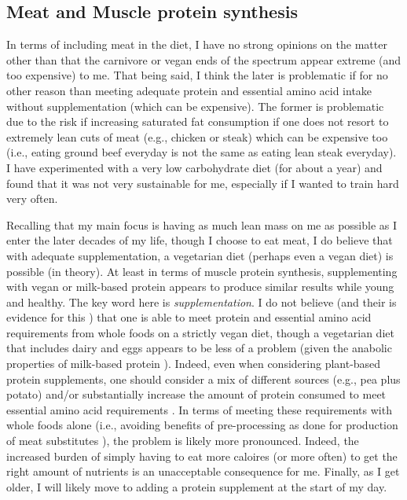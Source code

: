 \documentclass[10pt,twocolumn]{extarticle}
\begin{document}
\subsection{Meat and Muscle protein synthesis}

In terms of including meat in the diet, I have no strong opinions on the matter other than that the carnivore or vegan ends of the spectrum appear extreme (and too expensive) to me. That being said, I think the later is problematic if for no other reason than meeting adequate protein and essential amino acid intake without supplementation (which can be expensive). The former is problematic due to the risk if increasing saturated fat consumption if one does not resort to extremely lean cuts of meat (e.g., chicken or steak) which can be expensive too (i.e., eating ground beef everyday is not the same as eating lean steak everyday). I have experimented with a very low carbohydrate diet (for about a year) and found that it was not very sustainable for me, especially if I wanted to train hard very often. 

Recalling that my main focus is having as much lean mass on me as possible as I enter the later decades of my life, though I choose to eat meat, I do believe that with adequate supplementation, a vegetarian diet (perhaps even a vegan diet) is possible (in theory). At least in terms of muscle protein synthesis, supplementing with vegan or milk-based protein appears to produce similar results \cite{pinckaers2024post,pinckaers2024muscle} while young and healthy. The key word here is \textit{supplementation}. I do not believe (and their is evidence for this \cite{pinckaers2023higher}) that one is able to meet protein and essential amino acid requirements from whole foods on a strictly vegan diet, though a vegetarian diet that includes dairy and eggs appears to be less of a problem (given the anabolic properties of milk-based protein \cite{gorissen2018protein}). Indeed, even when considering plant-based protein supplements, one should consider a mix of different sources (e.g., pea plus potato) and/or substantially increase the amount of protein consumed to meet essential amino acid requirements \cite{gorissen2018protein}. In terms of meeting these requirements with whole foods alone (i.e., avoiding benefits of pre-processing as done for production of meat substitutes \cite{shaghaghian2022digestibility}), the problem is likely more pronounced. Indeed, the increased burden of simply having to eat more caloires (or more often) to get the right amount of nutrients is an unacceptable consequence for me. Finally, as I get older, I will likely move to adding a protein supplement at the start of my day.
\end{document}
